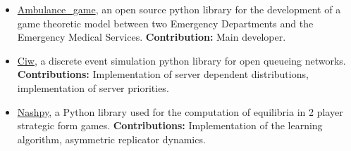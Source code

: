 \begin{itemize}
\item
\href{https://github.com/MichalisPanayides/AmbulanceDecisionGame}{Ambulance\_game},
an open source python library for the development of a game theoretic model
between two Emergency Departments and the Emergency Medical Services.
\textbf{Contribution:} Main developer.

\item \href{https://github.com/CiwPython/Ciw}{Ciw}, a discrete event simulation
python library for open queueing networks.
\textbf{Contributions:} Implementation of server dependent distributions,
implementation of server priorities.

\item \href{https://github.com/drvinceknight/Nashpy}{Nashpy}, a Python library
used for the computation of equilibria in 2 player strategic form games.
\textbf{Contributions:} Implementation of the learning algorithm, asymmetric
replicator dynamics.

\end{itemize}